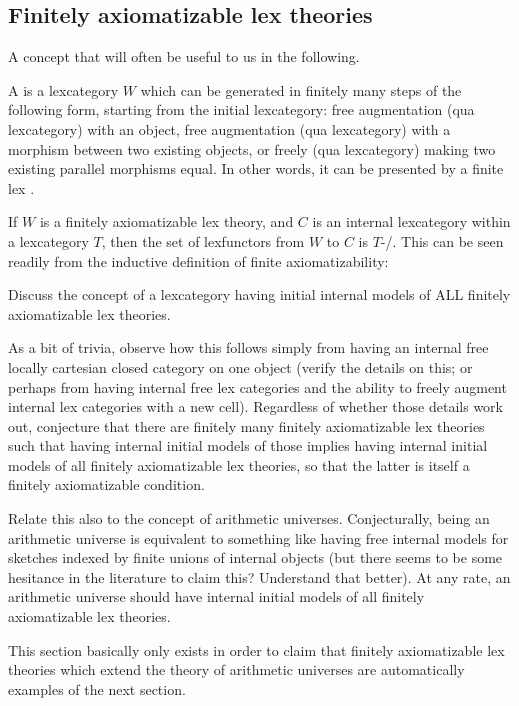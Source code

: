 \subsection{Finitely axiomatizable lex theories}
A concept that will often be useful to us in the following.

\begin{definition}
A  is a lexcategory $W$ which can be generated in finitely many steps of the following form, starting from the initial lexcategory: free augmentation (qua lexcategory) with an object, free augmentation (qua lexcategory) with a morphism between two existing objects, or freely (qua lexcategory) making two existing parallel morphisms equal. In other words, it can be presented by a finite lex .
\end{definition}

If $W$ is a finitely axiomatizable lex theory, and $C$ is an internal lexcategory within a lexcategory $T$, then the set of lexfunctors from $W$ to $C$ is $T$-\repsmall/. This can be seen readily from the inductive definition of finite axiomatizability: 

\begin{TODOblock}
Discuss the concept of a lexcategory having initial internal models of ALL finitely axiomatizable lex theories.

As a bit of trivia, observe how this follows simply from having an internal free locally cartesian closed category on one object (verify the details on this; or perhaps from having internal free lex categories and the ability to freely augment internal lex categories with a new cell). Regardless of whether those details work out, conjecture that there are finitely many finitely axiomatizable lex theories such that having internal initial models of those implies having internal initial models of all finitely axiomatizable lex theories, so that the latter is itself a finitely axiomatizable condition.

Relate this also to the concept of arithmetic universes. Conjecturally, being an arithmetic universe is equivalent to something like having free internal models for sketches indexed by finite unions of internal objects (but there seems to be some hesitance in the literature to claim this? Understand that better). At any rate, an arithmetic universe should have internal initial models of all finitely axiomatizable lex theories.

This section basically only exists in order to claim that finitely axiomatizable lex theories which extend the theory of arithmetic universes are automatically examples of the next section.
\end{TODOblock}

